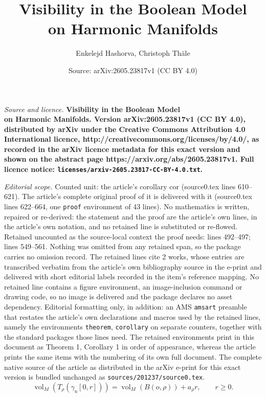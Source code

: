 \documentclass[10pt,a4paper]{amsart}
\title{\bfseries Visibility in the Boolean Model \\ on Harmonic Manifolds}
\author{Enkelejd Hashorva, Christoph Th\"ale}
\date{Source: arXiv:2605.23817v1 (CC BY 4.0)}
\newcommand{\vol}{\mathop{\mathrm{vol}}\nolimits}
\begin{document}
\maketitle

\noindent\emph{Source and licence.} \bfseries Visibility in the Boolean Model \\ on Harmonic Manifolds. Version arXiv:2605.23817v1 (CC BY 4.0), distributed by arXiv under the Creative Commons Attribution 4.0 International licence, http://creativecommons.org/licenses/by/4.0/, as recorded in the arXiv licence metadata for this exact version and shown on the abstract page https://arxiv.org/abs/2605.23817v1. Full licence notice: \texttt{licenses/arxiv-2605.23817-CC-BY-4.0.txt}.\par\smallskip

\noindent\textit{Editorial scope.} Counted unit: the article's corollary cor (source0.tex lines 610--621). The article's complete original proof of it is delivered with it (source0.tex lines 622--664, one \texttt{proof} environment of 43 lines). No mathematics is written, repaired or re-derived: the statement and the proof are the article's own lines, in the article's own notation, and no retained line is substituted or re-flowed.  Retained uncounted as the source-local context the proof needs: lines 492--497; lines 549--561.  Nothing was omitted from any retained span, so the package carries no omission record.  The retained lines cite 2 works, whose entries are transcribed verbatim from the article's own bibliography source in the e-print and delivered with short editorial labels recorded in the item's reference mapping.  No retained line contains a figure environment, an image-inclusion command or drawing code, so no image is delivered and the package declares no asset dependency.  Editorial formatting only, in addition: an AMS \texttt{amsart} preamble that restates the article's own declarations and macros used by the retained lines, namely the environments \texttt{theorem}, \texttt{corollary} on separate counters, together with the standard packages those lines need.  The retained environments print in this document as Theorem 1, Corollary 1 in order of appearance, whereas the article prints the same items with the numbering of its own full document.  The complete native source of the article as distributed in the arXiv e-print for this exact version is bundled unchanged as \texttt{sources/201237/source0.tex}.
\begin{equation}\label{eq:arho}
	\vol_M(T_\rho(\gamma_u[0,r]))
	=
	\vol_M(B(o,\rho))+a_\rho r,
	\qquad r\geq 0.
\end{equation}
\end{document}
